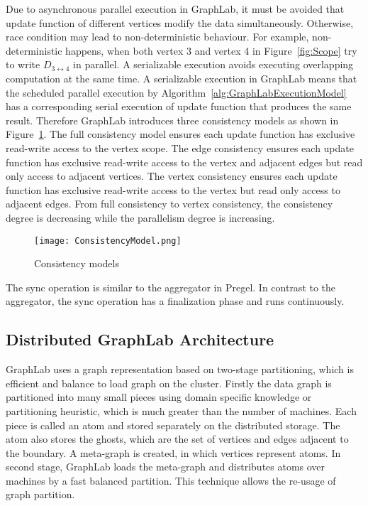 Due to asynchronous parallel execution in GraphLab, it must be avoided that update function of different vertices modify the data simultaneously. Otherwise, race condition may lead to non-deterministic behaviour. For example, non-deterministic happens, when both vertex 3 and vertex 4 in Figure~\ref{fig:Scope} try to write $D_{3 \leftrightarrow 4}$ in parallel. A serializable execution avoids executing overlapping computation at the same time. A serializable execution in GraphLab means that the scheduled parallel execution by Algorithm~\vref{alg:GraphLabExecutionModel} has a corresponding serial execution of update function that produces the same result. Therefore GraphLab introduces three consistency models as shown in Figure~\ref{fig:ConsistencyModel}. The full consistency model ensures each update function has exclusive read-write access to the vertex scope. The edge consistency ensures each update function has exclusive read-write access to the vertex and adjacent edges but read only access to adjacent vertices. The vertex consistency ensures each update function has exclusive read-write access to the vertex but read only access to adjacent edges. From full consistency to vertex consistency, the consistency degree is decreasing while the parallelism degree is increasing.

\begin{figure}[H]
  \begin{center}
    \texttt{[image: ConsistencyModel.png]}
    \caption{Consistency models}
    \label{fig:ConsistencyModel}
  \end{center}
\end{figure}

The sync operation is similar to the aggregator in Pregel. In contrast to the aggregator, the sync operation has a finalization phase and runs continuously.

\subsection{Distributed GraphLab Architecture}

GraphLab uses a graph representation based on two-stage partitioning, which is efficient and balance to load graph on the cluster. Firstly the data graph is partitioned into many small pieces using domain specific knowledge or partitioning heuristic, which is much greater than the number of machines. Each piece is called an atom and stored separately on the distributed storage. The atom also stores the ghosts, which are the set of vertices and edges adjacent to the boundary. A meta-graph is created, in which vertices represent atoms. In second stage, GraphLab loads the meta-graph and distributes atoms over machines by a fast balanced partition. This technique allows the re-usage of graph partition.

